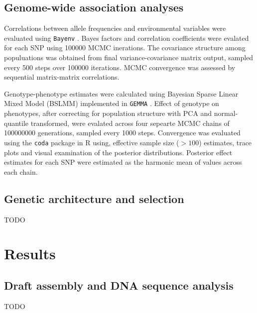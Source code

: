 \documentclass[smallextended]{svjour3}
\begin{document}
\subsection*{Genome-wide association analyses}

Correlations between allele frequencies and environmental variables were
evaluated using \texttt{Bayenv} \citep[][version 2.0]{Gunther:2013ik,COOP:2010ke}.  Bayes
factors and correlation coefficients were evalated for each SNP using
\num{100000} MCMC inerations.  The covariance structure among populuations was
obtained from final variance-covariance matrix output, sampled every 500 steps
over \num{100000} iterations.  MCMC convergence was assessed by sequential
matrix-matrix  correlations.

Genotype-phenotype estimates were calculated using Bayesian Sparse Linear Mixed
Model (BSLMM) implemented in \texttt{GEMMA} \citep[][version
0.94.1]{Zhou:2013fh}.  Effect of  genotype on phenotypes, after correcting for
population structure with PCA and normal-quantile transformed, were evalated
across four sepearte MCMC chains of \num{100000000} generations, sampled  every
1000 steps.  Convergence was evaluated using the \texttt{coda} package in R
\citep[][version 0.18.1]{coda} using, effective sample size ($> 100$) estimates,
trace plots and visual examination of the posterior distributions. Posterior
effect estimates for each SNP were estimated as the harmonic mean of values
across each chain.


\subsection*{Genetic architecture and selection}
TODO

\section*{Results}

\subsection*{Draft assembly and DNA sequence analysis}
TODO
\end{document}
